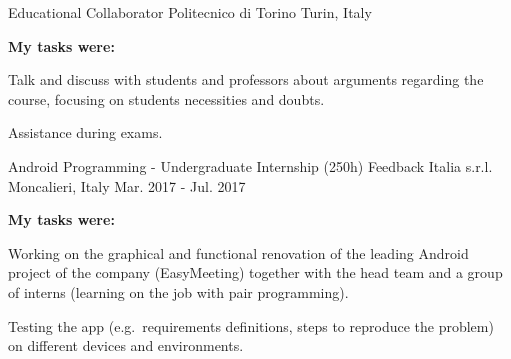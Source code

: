 {\begin{cventries}
  \cventry
    {Educational Collaborator} %
    {Politecnico di Torino} %
    {Turin, Italy} %
    {} %
    {
      \begin{cvsubentries}
      \end{cvsubentries}
      \begin{cvparagraph}
        \vspace{-3mm}
        {\textbf{My tasks were:}}
      \end{cvparagraph}
      \begin{cvitems} %
        \item {Talk and discuss with students and professors about arguments regarding the course, focusing on students necessities and doubts.}
        \item {Assistance during exams.}
      \end{cvitems}
    }{}

  \cventry
    {Android Programming - Undergraduate Internship (250h)} %
    {Feedback Italia s.r.l.} %
    {Moncalieri, Italy} %
    {Mar. 2017 - Jul. 2017} %
    {
      \begin{cvparagraph}
        {\textbf{My tasks were:}}
      \end{cvparagraph}
      \begin{cvitems} %
        \item {Working on the graphical and functional renovation of the leading Android project of the company (EasyMeeting) together with the head team and a group of interns (learning on the job with pair programming).}
        \item {Testing the app (e.g.\ requirements definitions, steps to reproduce the problem) on different devices and environments.}
      \end{cvitems}
    }{}


\end{cventries}}
